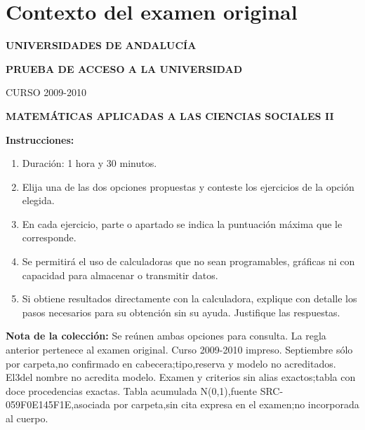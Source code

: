 \section*{Contexto del examen original}
\textbf{UNIVERSIDADES DE ANDALUCÍA}\par
\textbf{PRUEBA DE ACCESO A LA UNIVERSIDAD}\par
CURSO 2009-2010\par
\textbf{MATEMÁTICAS APLICADAS A LAS CIENCIAS SOCIALES II}

\textbf{Instrucciones:}
\begin{enumerate}[label=\textbf{\alph*)}]
  \item Duración: 1 hora y 30 minutos.
  \item Elija una de las dos opciones propuestas y conteste los ejercicios de la opción elegida.
  \item En cada ejercicio, parte o apartado se indica la puntuación máxima que le corresponde.
  \item Se permitirá el uso de calculadoras que no sean programables, gráficas ni con capacidad para almacenar o transmitir datos.
  \item Si obtiene resultados directamente con la calculadora, explique con detalle los pasos necesarios para su obtención sin su ayuda. Justifique las respuestas.
\end{enumerate}
\noindent\textbf{Nota de la colección:} Se reúnen ambas opciones para consulta. La regla anterior pertenece al examen original. Curso 2009-2010 impreso. Septiembre sólo por carpeta,no confirmado en cabecera;tipo,reserva y modelo no acreditados. El3del nombre no acredita modelo. Examen y criterios sin alias exactos;tabla con doce procedencias exactas. Tabla acumulada N(0,1),fuente SRC-059F0E145F1E,asociada por carpeta,sin cita expresa en el examen;no incorporada al cuerpo.
\par\medskip
